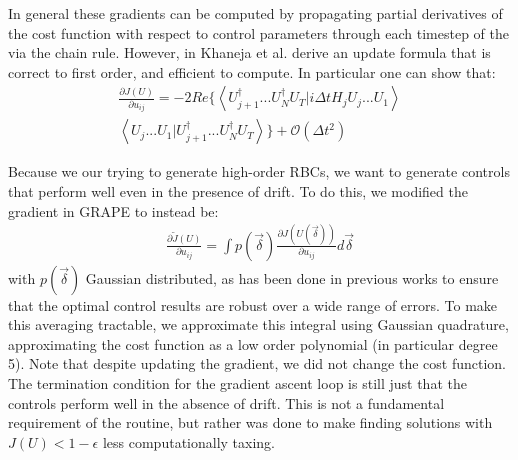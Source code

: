 \documentclass[aps,nofootinbib,pra,notitlepage,twocolumn]{revtex4-1}
\newcommand{\braket}[2]{\left\langle #1 | #2 \right\rangle}
\begin{document}
In general these gradients can be computed by propagating partial derivatives of the cost function with respect to control parameters through each timestep of the  via the chain rule. However, in \cite{Khaneja2005} Khaneja et al. derive an update formula that is correct to first order, and efficient to compute. In particular one can show that:
\begin{equation}\label{eq:update}
  \begin{split}
\frac{\partial J(U)}{\partial u_{ij}} = -2Re\{\braket{{U_{j+1}^{\dagger}...U_N^{\dagger} U_T}}{i\Delta tH_jU_j...U_1}\\
\braket{U_j...U_1}{U_{j+1}^{\dagger}...U_N^{\dagger} U_T}\} +  \mathcal{O}(\Delta t^2)
  \end{split}
\end{equation}

Because we our trying to generate high-order RBCs, we want to generate controls that perform well even in the presence of drift. To do this, we modified the gradient in GRAPE to instead be:
\begin{align}\label{quadrature}
\frac{\partial \tilde J(U)}{\partial u_{ij}} =
\int p(\vec{\delta})\frac{\partial J(U(\vec{\delta}))}{\partial u_{ij}} d\vec{\delta}
\end{align}
with $p(\vec{\delta})$ Gaussian distributed, as has been done in previous works \cite{Goerz2014} to ensure that the optimal control results are robust over a wide range of errors. To make this averaging tractable, we approximate this integral using Gaussian quadrature, approximating the cost function as a low order polynomial\cite{abramowiz1972handbook} (in particular degree 5). Note that despite updating the gradient, we did not change the cost function. The termination condition for the gradient ascent loop is still just that the controls perform well in the absence of drift. This is not a fundamental requirement of the routine, but rather was done to make finding solutions with $J(U) < 1 - \epsilon$  less computationally taxing.
\end{document}
